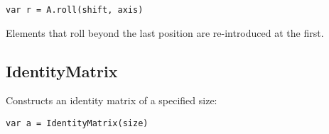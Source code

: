 \begin{lstlisting}
var r = A.roll(shift, axis)
\end{lstlisting}

Elements that roll beyond the last position are re-introduced at the
first.

\hypertarget{identitymatrix}{%
\subsection{IdentityMatrix}\label{identitymatrix}}

Constructs an identity matrix of a specified size:

\begin{lstlisting}
var a = IdentityMatrix(size)
\end{lstlisting}
